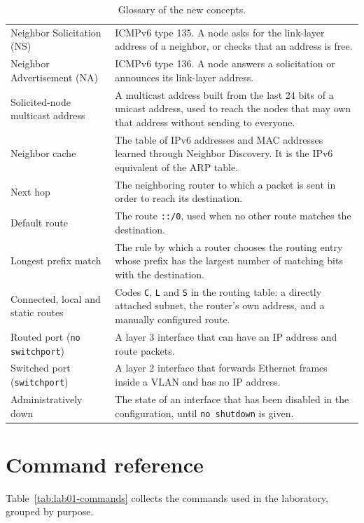 \begin{table}[h]
\begin{tabular}{@{}p{4.2cm}p{11cm}@{}}
Neighbor Solicitation (NS) & ICMPv6 type 135. A node asks for the link-layer address of a neighbor, or checks that an address is free. \\
Neighbor Advertisement (NA) & ICMPv6 type 136. A node answers a solicitation or announces its link-layer address. \\
Solicited-node multicast address & A multicast address built from the last 24 bits of a unicast address, used to reach the nodes that may own that address without sending to everyone. \\
Neighbor cache & The table of IPv6 addresses and MAC addresses learned through Neighbor Discovery. It is the IPv6 equivalent of the ARP table. \\
Next hop & The neighboring router to which a packet is sent in order to reach its destination. \\
Default route & The route \texttt{::/0}, used when no other route matches the destination. \\
Longest prefix match & The rule by which a router chooses the routing entry whose prefix has the largest number of matching bits with the destination. \\
Connected, local and static routes & Codes \texttt{C}, \texttt{L} and \texttt{S} in the routing table: a directly attached subnet, the router's own address, and a manually configured route. \\
Routed port (\texttt{no switchport}) & A layer 3 interface that can have an IP address and route packets. \\
Switched port (\texttt{switchport}) & A layer 2 interface that forwards Ethernet frames inside a VLAN and has no IP address. \\
Administratively down & The state of an interface that has been disabled in the configuration, until \texttt{no shutdown} is given. \\
\bottomrule
\end{tabular}
\caption{Glossary of the new concepts.}
\label{tab:lab01-glossary}
\end{table}

\section{Command reference}
\label{sec:lab01-commands}

Table~\ref{tab:lab01-commands} collects the commands used in the laboratory, grouped by purpose.


